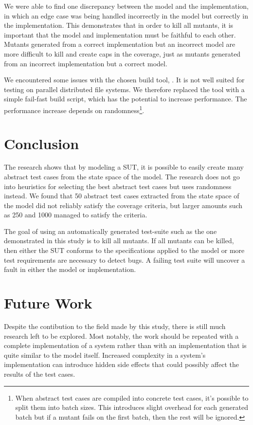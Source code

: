 \documentclass{article}
\begin{document}
		We were able to find one discrepancy between the model and the implementation, in which an edge case was being handled incorrectly in the model but correctly in the implementation. This demonstrates that in order to kill all mutants, it is important that the model and implementation must be faithful to each other. Mutants generated from a correct implementation but an incorrect model are more difficult to kill and create caps in the coverage, just as mutants generated from an incorrect implementation but a correct model.

		We encountered some issues with the chosen build tool, \citeauthor{sbt}. It is not well suited for testing on parallel distributed file systems. We therefore replaced the tool with a simple fail-fast build script, which has the potential to increase performance. The performance increase depends on randomness\footnote{When abstract test cases are compiled into concrete test cases, it's possible to split them into batch sizes. This introduces slight overhead for each generated batch but if a mutant fails on the first batch, then the rest will be ignored.}.


	\section{Conclusion}
		The research shows that by modeling a SUT, it is possible to easily create many abstract test cases from the state space of the model. The research does not go into heuristics for selecting the best abstract test cases but uses randomness instead. We found that 50 abstract test cases extracted from the state space of the model did not reliably satisfy the coverage criteria, but larger amounts such as 250 and 1000 managed to satisfy the criteria.

		The goal of using an automatically generated test-suite such as the one demonstrated in this study is to kill all mutants. If all mutants can be killed, then either the SUT conforms to the specifications applied to the model or more test requirements are necessary to detect bugs. A failing test suite will uncover a fault in either the model or implementation.

	\section{Future Work}
		Despite the contibution to the field made by this study, there is still much research left to be explored. Most notably, the work should be repeated with a complete implementation of a system rather than with an implementation that is quite similar to the model itself. Increased complexity in a system's implementation can introduce hidden side effects that could possibly affect the results of the test cases.
\end{document}
